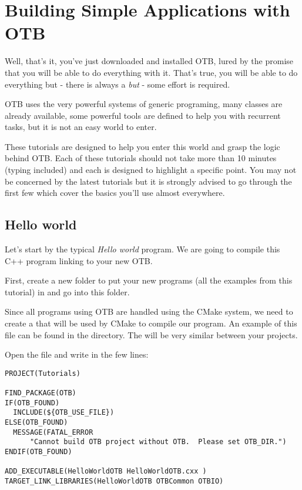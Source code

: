 \chapter{Building Simple Applications with OTB}

Well, that's it, you've just downloaded and installed OTB, lured by the promise
that you will be able to do everything with it. That's true, you will be able
to do everything but - there is always a {\em but} - some effort is required.

OTB uses the very powerful systems of generic programing, many classes are
already available, some powerful tools are defined to help you with recurrent
tasks, but it is not an easy world to enter. 

These tutorials are designed to help you enter this world and grasp the logic
behind OTB. Each of these tutorials should not take more than 10 minutes (typing
included) and each is designed to highlight a specific point. You may not be
concerned by the latest tutorials but it is strongly advised to go through the
first few which cover the basics you'll use almost everywhere.


\section{Hello world}
\label{sec:TutorialHelloWorld}


Let's start by the typical {\em Hello world} program. We are going to compile
this C++ program linking to your new OTB.

First, create a new folder to put your new programs (all the examples from this
tutorial) in and go into this folder. 

Since all programs using OTB are handled using the CMake system, we need to create a
 that will be used by CMake to compile our program. An
example of this file can be found in the 
directory. The  will be very similar between your projects.

Open the  file and write in the few lines:


\begin{small}
\begin{verbatim}
PROJECT(Tutorials)

FIND_PACKAGE(OTB)
IF(OTB_FOUND)
  INCLUDE(${OTB_USE_FILE})
ELSE(OTB_FOUND)
  MESSAGE(FATAL_ERROR
      "Cannot build OTB project without OTB.  Please set OTB_DIR.")
ENDIF(OTB_FOUND)

ADD_EXECUTABLE(HelloWorldOTB HelloWorldOTB.cxx )
TARGET_LINK_LIBRARIES(HelloWorldOTB OTBCommon OTBIO)
\end{verbatim}
\end{small}


